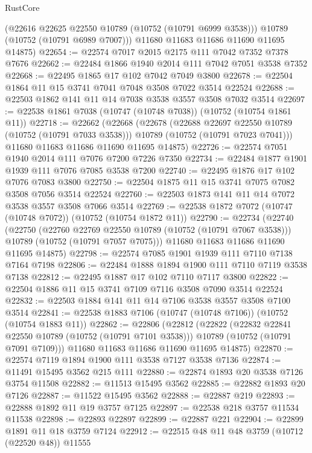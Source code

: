 \begin{lexlean}{RustCore}
\begin{coremodule}
        (@22616 @22625 @22550 @10789 (@10752 (@10791 @6999 @3538)))
        @10789
        (@10752 (@10791 @6989 @7007)))
      @11680
      @11683
      @11686
      @11690
      @11695
      @14875)
@22654 := @22574 @7017 @2015 @2175 @111 @7042 @7352 @7378 @7676
@22662 := @22484 @1866 @1940 @2014 @111 @7042 @7051 @3538 @7352
@22668 := @22495 @1865 @17 @102 @7042 @7049 @3800
@22678 := @22504 @1864 @11 @15 @3741 @7041 @7048 @3508 @7022 @3514 @22524
@22688 := @22503 @1862 @141 @11 @14 @7038 @3538 @3557 @3508 @7032 @3514
@22697 := @22538 @1861 @7038 (@10747 (@10748 @7038)) (@10752 (@10754 @1861 @11))
@22718 := @22662
    (@22668
      (@22678
        (@22688 @22697 @22550 @10789 (@10752 (@10791 @7033 @3538)))
        @10789
        (@10752 (@10791 @7023 @7041)))
      @11680
      @11683
      @11686
      @11690
      @11695
      @14875)
@22726 := @22574 @7051 @1940 @2014 @111 @7076 @7200 @7226 @7350
@22734 := @22484 @1877 @1901 @1939 @111 @7076 @7085 @3538 @7200
@22740 := @22495 @1876 @17 @102 @7076 @7083 @3800
@22750 := @22504 @1875 @11 @15 @3741 @7075 @7082 @3508 @7056 @3514 @22524
@22760 := @22503 @1873 @141 @11 @14 @7072 @3538 @3557 @3508 @7066 @3514
@22769 := @22538 @1872 @7072 (@10747 (@10748 @7072)) (@10752 (@10754 @1872 @11))
@22790 := @22734
    (@22740
      (@22750
        (@22760 @22769 @22550 @10789 (@10752 (@10791 @7067 @3538)))
        @10789
        (@10752 (@10791 @7057 @7075)))
      @11680
      @11683
      @11686
      @11690
      @11695
      @14875)
@22798 := @22574 @7085 @1901 @1939 @111 @7110 @7138 @7164 @7198
@22806 := @22484 @1888 @1894 @1900 @111 @7110 @7119 @3538 @7138
@22812 := @22495 @1887 @17 @102 @7110 @7117 @3800
@22822 := @22504 @1886 @11 @15 @3741 @7109 @7116 @3508 @7090 @3514 @22524
@22832 := @22503 @1884 @141 @11 @14 @7106 @3538 @3557 @3508 @7100 @3514
@22841 := @22538 @1883 @7106 (@10747 (@10748 @7106)) (@10752 (@10754 @1883 @11))
@22862 := @22806
    (@22812
      (@22822
        (@22832 @22841 @22550 @10789 (@10752 (@10791 @7101 @3538)))
        @10789
        (@10752 (@10791 @7091 @7109)))
      @11680
      @11683
      @11686
      @11690
      @11695
      @14875)
@22870 := @22574 @7119 @1894 @1900 @111 @3538 @7127 @3538 @7136
@22874 := @11491 @15495 @3562 @215 @111
@22880 := @22874 @1893 @20 @3538 @7126 @3754 @11508
@22882 := @11513 @15495 @3562
@22885 := @22882 @1893 @20 @7126
@22887 := @11522 @15495 @3562
@22888 := @22887 @219
@22893 := @22888 @1892 @11 @19 @3757 @7125
@22897 := @22538 @218 @3757 @11534 @11538
@22898 := @22893 @22897
@22899 := @22887 @221
@22904 := @22899 @1891 @11 @18 @3759 @7124
@22912 := @22515 @48 @11 @48 @3759 (@10712 (@22520 @48)) @11555

\end{coremodule}
\end{lexlean}
